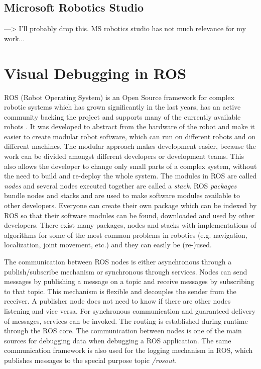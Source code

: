 \subsection{Microsoft Robotics Studio}
\cite{Jackson2007} ---> I'll probably drop this. MS robotics studio has not much relevance for my work...

\section{Visual Debugging in ROS}
\label{debugging_ros}

ROS (Robot Operating System) \cite{Quigley2009} is an Open Source framework for complex robotic systems which has grown significantly in the last years, has an active community backing the project and supports many of the currently available robots \cite{Foote2012}. It was developed to abstract from the hardware of the robot and make it easier to create modular robot software, which can run on different robots and on different machines. The modular approach makes development easier, because the work can be divided amongst different developers or development teams. This also allows the developer to change only small parts of a complex system, without the need to build and re-deploy the whole system.
The modules in ROS are called \emph{nodes} and several nodes executed together are called a \emph{stack}. ROS \emph{packages} bundle nodes and stacks and are used to make software modules available to other developers. Everyone can create their own package which can be indexed by ROS so that their software modules can be found, downloaded and used by other developers. There exist many packages, nodes and stacks with implementations of algorithms for some of the most common problems in robotics (e.g. navigation, localization, joint movement, etc.) and they can easily be (re-)used.

The communication between ROS nodes is either asynchronous through a publish/subscribe mechanism or synchronous through services. Nodes can send messages by publishing a message on a topic and receive messages by subscribing to that topic. This mechanism is flexible and decouples the sender from the receiver. A publisher node does not need to know if there are other nodes listening and vice versa. For synchronous communication and guaranteed delivery of messages, services can be invoked. The routing is established during runtime through the ROS core. The communication between nodes is one of the main sources for debugging data when debugging a ROS application. The same communication framework is also used for the logging mechanism in ROS, which publishes messages to the special purpose topic \emph{/rosout}.

